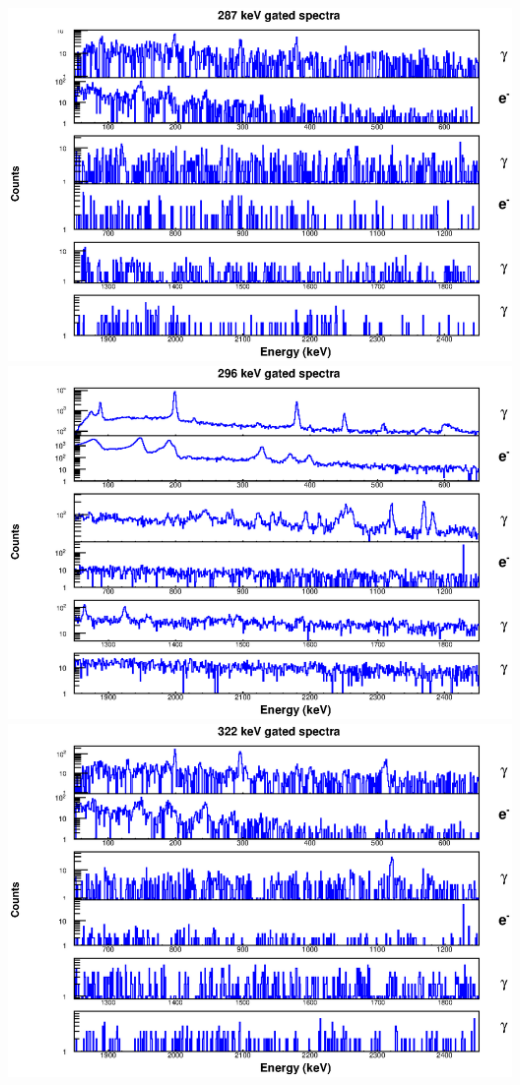 \includegraphics[scale=0.8]{156Gd_Appendix/287_combined.eps}
\includegraphics[scale=0.8]{156Gd_Appendix/296_combined.eps}
\includegraphics[scale=0.8]{156Gd_Appendix/322_combined.eps}
